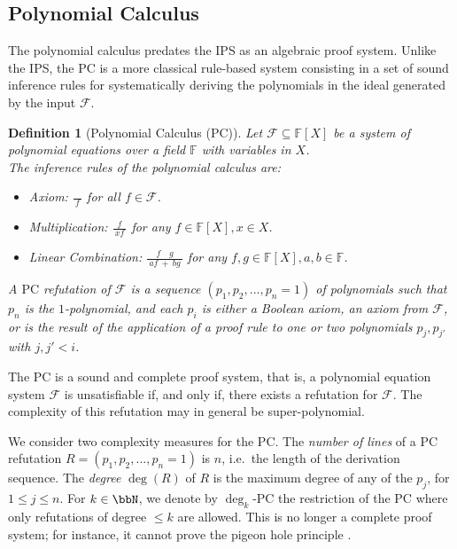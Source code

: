 \documentclass[10pt,a4paper]{article}
\newtheorem{definition}[theorem]{Definition}
\newcommand{\PC}{\mathrm{PC}}
\newcommand{\Field}{\ensuremath{\mathbb{F}}}
\newcommand{\F}{\ensuremath{\mathcal{F}}}
\begin{document}
	\subsection{Polynomial Calculus}
	The polynomial calculus \cite{groebner} predates the IPS as an algebraic proof system. Unlike the IPS, the PC is a more classical rule-based system consisting in a set of sound inference rules for systematically deriving the polynomials in the ideal generated by the input $\F$. 
	\begin{definition}[Polynomial Calculus (PC)]
		Let $\F \subseteq \Field[X]$ be a system of polynomial equations over a field $\Field$
		with variables in $X$. \\
		The \textit{inference rules} of the polynomial calculus are:
		\begin{itemize}
			\item Axiom: {\Large$\frac{}{~f~}$} for all $f \in \F$.
			\item Multiplication: {\Large$\frac{f}{~xf~}$} for any $f\in \Field[X], x\in X$.
			\item Linear Combination: {\Large$\frac{f\quad g}{~af ~+~ bg~}$}
			for any $f,g \in \Field[X], a,b \in \Field$.
		\end{itemize}
		A \textit{$\PC$ refutation} of $\F$ is a sequence $(p_1,p_2 , ... ,p_n = 1)$ of polynomials such that $p_n$ is the $1$-polynomial, and each $p_i$ is either a Boolean axiom, an axiom from $\F$, or is the result of the application of a proof rule to one or two polynomials $p_j, p_{j'}$ with $j,j' < i$.
	\end{definition}
	The PC  is a sound and complete proof system, that is, a polynomial equation system $\F$ is unsatisfiable if, and only if, there exists a refutation for $\F$. The complexity of this refutation may in general be super-polynomial.
	
	We consider two complexity measures for the PC. The \textit{number of lines} of a PC refutation
	$R = (p_1,p_2 , ... ,p_n = 1)$ is $n$, i.e.\ the length of the derivation sequence. 
	The \textit{degree} $\deg(R)$ of $R$ is the maximum degree of any of the $p_j$, for $1 \leq j \leq n$.
	For $k \in \bbN$, we denote by $\deg_k$-PC the restriction of the PC where only refutations of degree $\leq k$ are allowed. This is no longer a complete proof system; for instance, it cannot prove the pigeon hole principle \cite{razborov1998lower}.
\end{document}
